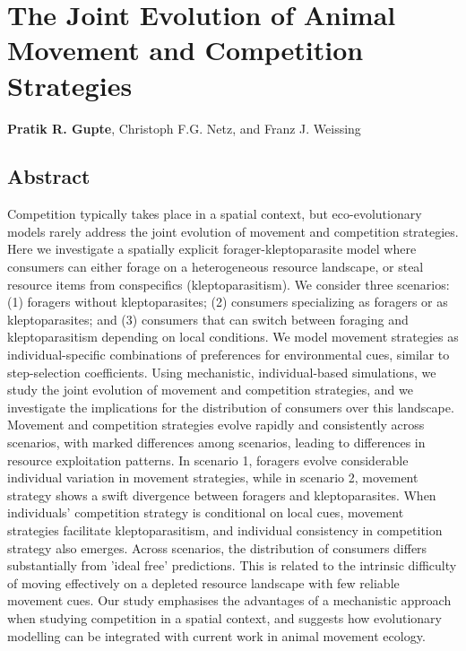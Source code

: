 \chapter{The Joint Evolution of Animal Movement and Competition Strategies}\label{ch:kleptomove}

{\noindent \sffamily\textbf{Pratik R. Gupte}, Christoph F.G. Netz, and Franz J. Weissing}

\section*{Abstract}

Competition typically takes place in a spatial context, but eco-evolutionary models rarely address the joint evolution of movement and competition strategies.
Here we investigate a spatially explicit forager-kleptoparasite model where consumers can either forage on a heterogeneous resource landscape, or steal resource items from conspecifics (kleptoparasitism). We consider three scenarios: (1) foragers without kleptoparasites; (2) consumers specializing as foragers or as kleptoparasites; and (3) consumers that can switch between foraging and kleptoparasitism depending on local conditions.
We model movement strategies as individual-specific combinations of preferences for environmental cues, similar to step-selection coefficients.
Using mechanistic, individual-based simulations, we study the joint evolution of movement and competition strategies, and we investigate the implications for the distribution of consumers over this landscape.
Movement and competition strategies evolve rapidly and consistently across scenarios, with marked differences among scenarios, leading to differences in resource exploitation patterns.
In scenario 1, foragers evolve considerable individual variation in movement strategies, while in scenario 2, movement strategy shows a swift divergence between foragers and kleptoparasites.
When individuals' competition strategy is conditional on local cues, movement strategies facilitate kleptoparasitism, and individual consistency in competition strategy also emerges.
Across scenarios, the distribution of consumers differs substantially from 'ideal free' predictions.
This is related to the intrinsic difficulty of moving effectively on a depleted resource landscape with few reliable movement cues.
Our study emphasises the advantages of a mechanistic approach when studying competition in a spatial context, and suggests how evolutionary modelling can be integrated with current work in animal movement ecology.

\clearpage
